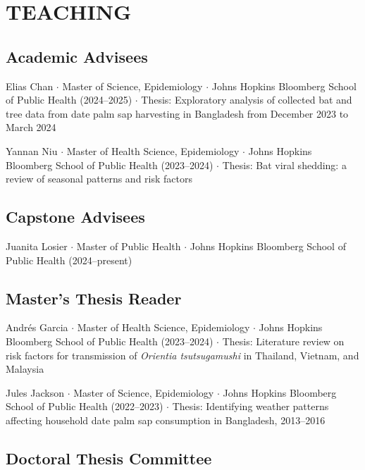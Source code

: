\documentclass{cv}
\begin{document}

\section*{TEACHING}

\subsection*{Academic Advisees}

Elias Chan $\cdot$ Master of Science, Epidemiology $\cdot$ Johns Hopkins Bloomberg School of Public Health (2024--2025) $\cdot$ Thesis: Exploratory analysis of collected bat and tree data from date palm sap harvesting in Bangladesh from December 2023 to March 2024

Yannan Niu $\cdot$ Master of Health Science, Epidemiology $\cdot$ Johns Hopkins Bloomberg School of Public Health (2023--2024) $\cdot$ Thesis: Bat viral shedding: a review of seasonal patterns and risk factors

\subsection*{Capstone Advisees}

Juanita Losier $\cdot$ Master of Public Health $\cdot$ Johns Hopkins Bloomberg School of Public Health (2024--present)

\subsection*{Master's Thesis Reader}

Andrés Garcia $\cdot$ Master of Health Science, Epidemiology $\cdot$ Johns Hopkins Bloomberg School of Public Health (2023--2024) $\cdot$ Thesis: Literature review on risk factors for transmission of \textit{Orientia tsutsugamushi} in Thailand, Vietnam, and Malaysia

Jules Jackson $\cdot$ Master of Science, Epidemiology $\cdot$ Johns Hopkins Bloomberg School of Public Health (2022--2023) $\cdot$ Thesis: Identifying weather patterns affecting household date palm sap consumption in Bangladesh, 2013--2016

\subsection*{Doctoral Thesis Committee}
\end{document}
